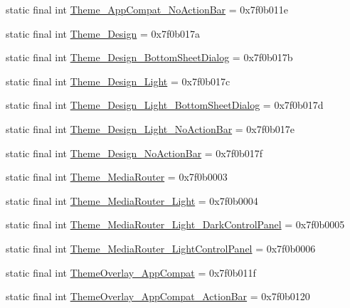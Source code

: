 \begin{CompactItemize}
\item 
static final int \hyperlink{classandroid_1_1support_1_1v7_1_1palette_1_1_r_1_1style_191e90076f50f3e1ece12fed1348a694}{Theme\_\-AppCompat\_\-NoActionBar} = 0x7f0b011e
\item 
static final int \hyperlink{classandroid_1_1support_1_1v7_1_1palette_1_1_r_1_1style_de10ad6870d700c2542816752de5910a}{Theme\_\-Design} = 0x7f0b017a
\item 
static final int \hyperlink{classandroid_1_1support_1_1v7_1_1palette_1_1_r_1_1style_2845fb811aa0fcf1d3eeb1dfe2f3ea9c}{Theme\_\-Design\_\-BottomSheetDialog} = 0x7f0b017b
\item 
static final int \hyperlink{classandroid_1_1support_1_1v7_1_1palette_1_1_r_1_1style_d10343069615762d549aafe8020cc12d}{Theme\_\-Design\_\-Light} = 0x7f0b017c
\item 
static final int \hyperlink{classandroid_1_1support_1_1v7_1_1palette_1_1_r_1_1style_7038069c12843d88248b26a7f1754320}{Theme\_\-Design\_\-Light\_\-BottomSheetDialog} = 0x7f0b017d
\item 
static final int \hyperlink{classandroid_1_1support_1_1v7_1_1palette_1_1_r_1_1style_397e264b65f50c4994249c0e78ae11d1}{Theme\_\-Design\_\-Light\_\-NoActionBar} = 0x7f0b017e
\item 
static final int \hyperlink{classandroid_1_1support_1_1v7_1_1palette_1_1_r_1_1style_2fe50859579641dc9cfa51cef341faca}{Theme\_\-Design\_\-NoActionBar} = 0x7f0b017f
\item 
static final int \hyperlink{classandroid_1_1support_1_1v7_1_1palette_1_1_r_1_1style_9235d4d124d24a156641bf57333e2a20}{Theme\_\-MediaRouter} = 0x7f0b0003
\item 
static final int \hyperlink{classandroid_1_1support_1_1v7_1_1palette_1_1_r_1_1style_94bbbe9bc5fc42b8a388b6826062e147}{Theme\_\-MediaRouter\_\-Light} = 0x7f0b0004
\item 
static final int \hyperlink{classandroid_1_1support_1_1v7_1_1palette_1_1_r_1_1style_2ef8c910b12e08b0cd8e27ef8c35ca6f}{Theme\_\-MediaRouter\_\-Light\_\-DarkControlPanel} = 0x7f0b0005
\item 
static final int \hyperlink{classandroid_1_1support_1_1v7_1_1palette_1_1_r_1_1style_192c82200fbbcb689ea543fa9e043d40}{Theme\_\-MediaRouter\_\-LightControlPanel} = 0x7f0b0006
\item 
static final int \hyperlink{classandroid_1_1support_1_1v7_1_1palette_1_1_r_1_1style_f65aa9938106957cc7e98b20d0ccae9f}{ThemeOverlay\_\-AppCompat} = 0x7f0b011f
\item 
static final int \hyperlink{classandroid_1_1support_1_1v7_1_1palette_1_1_r_1_1style_e4ca22bf7cb0a27779c443203f826f5a}{ThemeOverlay\_\-AppCompat\_\-ActionBar} = 0x7f0b0120

\end{CompactItemize}
